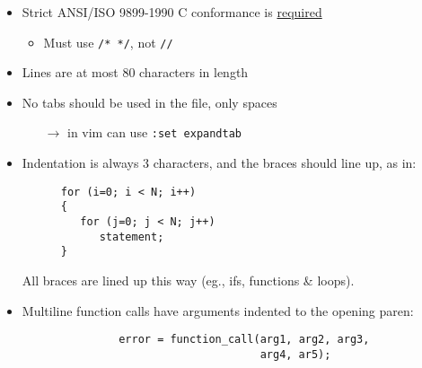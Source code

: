 \documentclass[11pt]{article}
\begin{document}
\begin{itemize}
\item Strict ANSI/ISO 9899-1990 C conformance is \underline{required}
      \begin{itemize}
      \item Must use \verb+/* */+, not \verb+//+
      \end{itemize}
\item Lines are at most 80 characters in length
\item No tabs should be used in the file, only spaces
      \vspace*{-0.1in}
      \begin{itemize}
      \item [$\rightarrow$] in vim can use {\tt :set expandtab}
      \end{itemize}
\item Indentation is always 3 characters, and the braces should line
      up, as in:
      \vspace*{-0.1in}
      \begin{verbatim}
      for (i=0; i < N; i++)
      {
         for (j=0; j < N; j++)
            statement;
      }
      \end{verbatim}
      All braces are lined up this way (eg., ifs, functions \& loops).
\item Multiline function calls have arguments indented to the opening paren:
      \vspace*{-0.1in}
      \begin{verbatim}
               error = function_call(arg1, arg2, arg3,
                                     arg4, ar5);
      \end{verbatim}


\end{itemize}
\end{document}

